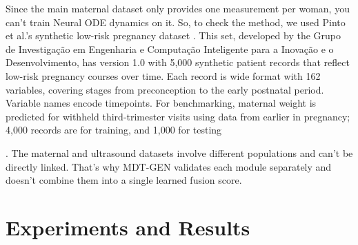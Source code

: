 \documentclass[conference]{IEEEtran}
\begin{document}
Since the main maternal dataset only provides one measurement per woman, you can't train Neural ODE dynamics on it. So, to check the method, we used Pinto et al.'s synthetic low-risk pregnancy dataset \cite{r39,r38}. This set, developed by the Grupo de Investigação em Engenharia e Computação Inteligente para a Inovação e o Desenvolvimento, has version 1.0 with 5,000 synthetic patient records that reflect low-risk pregnancy courses over time. Each record is wide format with 162 variables, covering stages from preconception to the early postnatal period. Variable names encode timepoints. For benchmarking, maternal weight is predicted for withheld third-trimester visits using data from earlier in pregnancy; 4,000 records are for training, and 1,000 for testing



\begin{table}[t]
\centering
\caption{Summary of datasets and their role}\label{tab:3}
\scriptsize
{}
\end{table}


. The maternal and ultrasound datasets involve different populations and can't be directly linked. That's why MDT-GEN validates each module separately and doesn't combine them into a single learned fusion score.



\section{Experiments and Results}
\end{document}
